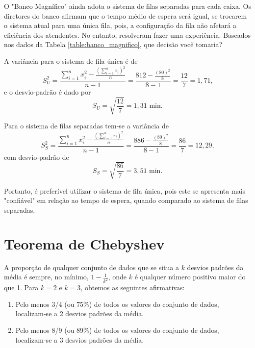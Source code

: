 \documentclass[11pt,fleqn]{book}
\numberwithin{mpicture}{chapter}
\numberwithin{mtable}{chapter}
\numberwithin{mframe}{chapter}
\begin{document}
\begin{example}
	O "Banco Magnífico" ainda adota o sistema de filas separadas para cada caixa. Os diretores do banco afirmam que o tempo médio de espera será igual, se trocarem o sistema atual para uma única fila, pois, a configuração da fila não afetará a eficiência dos atendentes. No entanto, resolveram fazer uma experiência. Baseados nos dados da Tabela \ref{table:banco_magnifico}, que decisão você tomaria?
	
	A variância para o sistema de fila única é de
	\[
		S_U^2 = \frac{
			\displaystyle\sum_{i=1}^{n} x_i^2 -
			\displaystyle\frac{
				\left (
					\displaystyle\sum_{i=1}^{n} x_i
				\right ) ^ 2
			}{n}
		}{n-1}
		=
		\frac{812-\displaystyle\frac{(80)^2}{8}}{8-1}
		=\frac{12}{7}
		=1,71\text{,}
	\]
	e o desvio-padrão é dado por
	\[
		S_{U} = \sqrt{\frac{12}{7}}=1,31\text{ min.}
	\]
	
	Para o sistema de filas separadas tem-se a variância de
	\[
		S_S^2 = \frac{
			\displaystyle\sum_{i=1}^{n} x_i^2 -
			\displaystyle\frac{
				\left (
					\displaystyle\sum_{i=1}^{n} x_i
				\right ) ^ 2
			}{n}
		}{n-1}
		=
		\frac{886-\displaystyle\frac{(80)^2}{8}}{8-1}
		=\frac{86}{7}
		=12,29\text{,}
	\]
	com desvio-padrão de
	\[
		S_S=\sqrt{\frac{86}{7}}=3,51\text{ min.}
	\]
	
	Portanto, é preferível utilizar o sistema de fila única, pois este se apresenta mais "confiável" em relação ao tempo de espera, quando comparado ao sistema de filas separadas.
\end{example}

\section{Teorema de Chebyshev}

A proporção de qualquer conjunto de dados que se situa a $k$ desvios padrões da média é sempre, no mínimo, $1-\frac{1}{k^2}$, onde $k$ é qualquer número positivo maior do que 1. Para $k=2$ e $k=3$, obtemos as seguintes afirmativas:

\begin{enumerate}
	\item Pelo menos 3/4 (ou 75\%) de todos os valores do conjunto de dados, localizam-se a 2 desvios padrões da média.
	
	\item Pelo menos 8/9 (ou 89\%) de todos os valores do conjunto de dados, localizam-se a 3 desvios padrões da média.
\end{enumerate}
\end{document}
